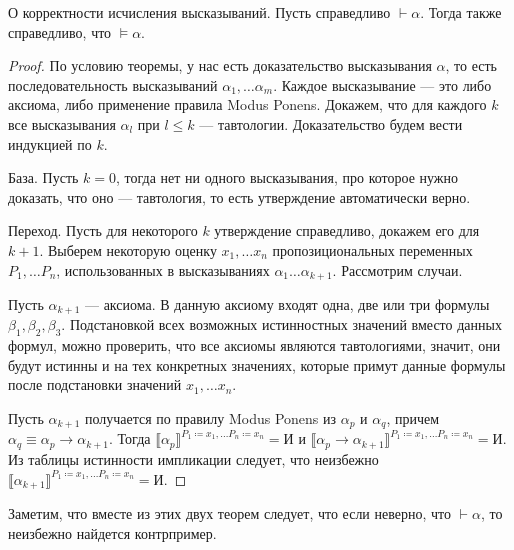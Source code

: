 \begin{theorem}{О корректности исчисления высказываний.}
Пусть справедливо $\vdash \alpha$. Тогда также справедливо, что $\models \alpha$.
\end{theorem}

\begin{proof}
По условию теоремы, у нас есть доказательство высказывания $\alpha$, то есть 
последовательность высказываний $\alpha_1, \dots \alpha_m$.
Каждое высказывание --- это либо аксиома, либо применение правила Modus Ponens.
Докажем, что для каждого $k$ все высказывания $\alpha_l$ при $l \le k$ --- тавтологии.
Доказательство будем вести индукцией по $k$.

База. Пусть $k=0$, тогда нет ни одного высказывания, про которое нужно доказать, что
оно --- тавтология, то есть утверждение автоматически верно.

Переход. Пусть для некоторого $k$ утверждение справедливо, докажем его для $k+1$.
Выберем некоторую оценку $x_1, \dots x_n$ пропозициональных 
переменных $P_1, \dots P_n$, использованных в высказываниях $\alpha_1 \dots \alpha_{k+1}$.
Рассмотрим случаи. 

Пусть $\alpha_{k+1}$ --- аксиома. В данную аксиому входят одна, две или три формулы
$\beta_1, \beta_2, \beta_3$. Подстановкой всех возможных истинностных значений
вместо данных формул, можно проверить, что все аксиомы являются тавтологиями,
значит, они будут истинны и на тех конкретных значениях, которые примут данные формулы
после подстановки значений $x_1, \dots x_n$.

Пусть $\alpha_{k+1}$ получается по правилу Modus Ponens из $\alpha_p$ и 
$\alpha_q$, причем $\alpha_q \equiv \alpha_p \rightarrow \alpha_{k+1}$.
Тогда $\llbracket\alpha_p\rrbracket^{P_1 \coloneqq  x_1, \dots P_n\coloneqq x_n} = \texttt{И}$ и 
$\llbracket\alpha_p \rightarrow \alpha_{k+1}\rrbracket^{P_1\coloneqq x_1, \dots P_n\coloneqq x_n} = \texttt{И}$.
Из таблицы истинности импликации следует, что неизбежно 
$\llbracket\alpha_{k+1}\rrbracket^{P_1\coloneqq x_1, \dots P_n\coloneqq x_n} = \texttt{И}$.

\end{proof}

Заметим, что вместе из этих двух теорем следует, что если неверно, что $\vdash \alpha$,
то неизбежно найдется контрпример.

